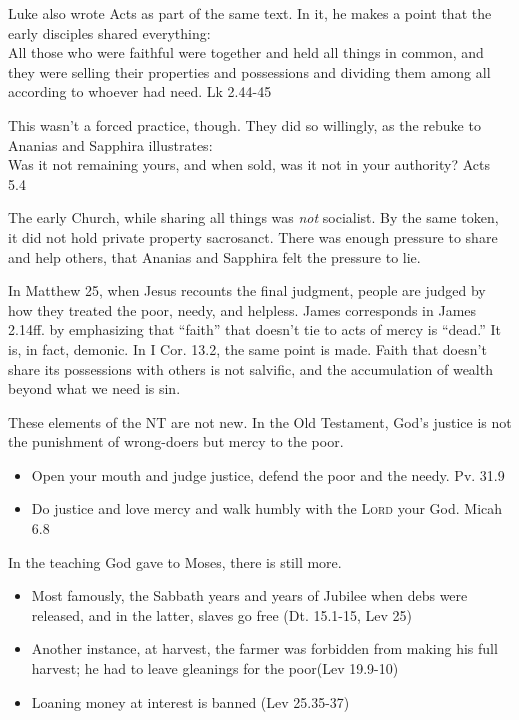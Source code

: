 \documentclass{beamer}
\begin{document}
\begin{frame}
  Luke also wrote Acts as part of the same text.
  In it, he makes a point that the early disciples shared everything:\\
  All those who were faithful were together and held all things in common,
  and they were selling their properties and possessions and dividing them among all according to whoever had need. Lk 2.44-45
\end{frame}

\begin{frame}
  This wasn't a forced practice, though.
  They did so willingly, as the rebuke to Ananias and Sapphira illustrates:\\
  Was it not remaining yours, and when sold, was it not in your authority? Acts 5.4\\
\end{frame}

\begin{frame}
  The early Church, while sharing all things was \emph{not} socialist.
  By the same token, it did not hold private property sacrosanct.
  There was enough pressure to share and help others, that Ananias and Sapphira felt the pressure to lie.
\end{frame}

\begin{frame}
  In Matthew 25, when Jesus recounts the final judgment, people are judged by how they treated the poor, needy, and helpless.
  James corresponds in James 2.14ff. by emphasizing that ``faith'' that doesn't tie to acts of mercy is ``dead.''
  It is, in fact, demonic.
  In I Cor. 13.2, the same point is made.
  Faith that doesn't share its possessions with others is not salvific, and the accumulation of wealth beyond what we need is sin.
\end{frame}

\begin{frame}
  These elements of the NT are not new.
  In the Old Testament, God's justice is not the punishment of wrong-doers but mercy to the poor.\pause
  \begin{itemize}
	\item Open your mouth and judge justice, defend the poor and the needy. Pv. 31.9\pause
	\item Do justice and love mercy and walk humbly with the \textsc{Lord} your God. Micah 6.8
  \end{itemize}
\end{frame}

\begin{frame}
  In the teaching God gave to Moses, there is still more.\pause
  \begin{itemize}
	\item Most famously, the Sabbath years and years of Jubilee when debs were released, and in the latter, slaves go free (Dt. 15.1-15, Lev 25)\pause
	\item Another instance, at harvest, the farmer was forbidden from making his full harvest; he had to leave gleanings for the poor(Lev 19.9-10)\pause
	\item Loaning money at interest is banned (Lev 25.35-37)
  \end{itemize}
\end{frame}
\end{document}
